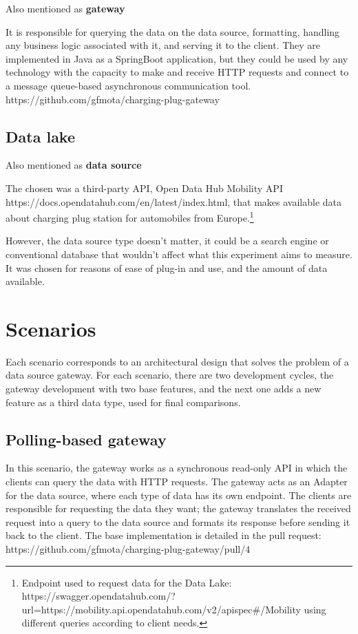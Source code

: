 Also mentioned as \textbf{gateway}

It is responsible for querying the data on the data source, formatting, handling any business logic associated with it, and serving it to the client. They are implemented in Java as a SpringBoot application, but they could be used by any technology with the capacity to make and receive HTTP requests and connect to a message queue-based asynchronous communication tool. https://github.com/gfmota/charging-plug-gateway

\subsection*{Data lake}
\label{sec:datalake}

Also mentioned as \textbf{data source}

The chosen was a third-party API, Open Data Hub Mobility API https://docs.opendatahub.com/en/latest/index.html, that makes available data about charging plug station for automobiles from Europe.\footnote{Endpoint used to request data for the Data Lake: https://swagger.opendatahub.com/?url=https://mobility.api.opendatahub.com/v2/apispec#/Mobility using different queries according to client needs.}

However, the data source type doesn't matter, it could be a search engine or conventional database that wouldn't affect what this experiment aims to measure. It was chosen for reasons of ease of plug-in and use, and the amount of data available.   

\section{Scenarios}
\label{sec:scenarios}

Each scenario corresponds to an architectural design that solves the problem of a data source gateway. For each scenario, there are two development cycles, the gateway development with two base features, and the next one adds a new feature as a third data type, used for final comparisons.

\subsection*{Polling-based gateway}
\label{sec:polling}

In this scenario, the gateway works as a synchronous read-only API in which the clients can query the data with HTTP requests. The gateway acts as an Adapter for the data source, where each type of data has its own endpoint. The clients are responsible for requesting the data they want; the gateway translates the received request into a query to the data source and formats its response before sending it back to the client. The base implementation is detailed in the pull request: https://github.com/gfmota/charging-plug-gateway/pull/4


